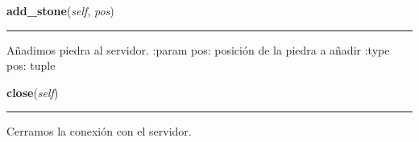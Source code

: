     \vspace{0.5ex}

\hspace{.8\funcindent}\begin{boxedminipage}{\funcwidth}

    \raggedright \textbf{add\_stone}(\textit{self}, \textit{pos})

    \vspace{-1.5ex}

    \rule{\textwidth}{0.5\fboxrule}
\setlength{\parskip}{2ex}

Añadimos piedra al servidor.
:param pos: posición de la piedra a añadir
:type pos: tuple
\setlength{\parskip}{1ex}
    \end{boxedminipage}

    \label{src:igs:Igs:close}

    \vspace{0.5ex}

\hspace{.8\funcindent}\begin{boxedminipage}{\funcwidth}

    \raggedright \textbf{close}(\textit{self})

    \vspace{-1.5ex}

    \rule{\textwidth}{0.5\fboxrule}
\setlength{\parskip}{2ex}

Cerramos la conexión con el servidor.
\setlength{\parskip}{1ex}
    \end{boxedminipage}

